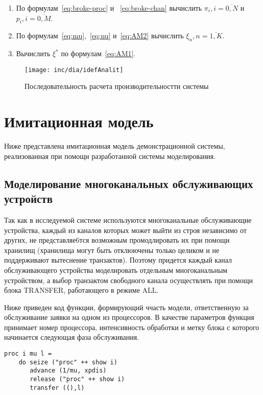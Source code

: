 \begin{enumerate}
\item По формулам~\ref{eq:broke-proc} и ~\ref{eq:broke-chan} вычислить $\pi_i, i=\overline{0,N}$ и $p_i, i=\overline{0,M} $.
\item По формулам~\ref{eq:mu},~\ref{eq:nu} и~\ref{eq:AM2} вычислить $\xi_n, n=\overline{1,K}$.
\item Вычислить $\xi^{*}$ по формулам~\ref{eq:AM1}.
\end{enumerate}


\begin{figure}[ht!]
\centering
\texttt{[image: inc/dia/idefAnalit]}
\caption{Последовательность расчета производительностти системы}
\label{fig:idefAnalit}
\end{figure}

\section{Имитационная модель}

Ниже представлена имитационная модель демонстрационной системы, реализованная при помощи разработанной системы моделирования.

\subsection{Моделирование многоканальных обслуживающих устройств}

Так как в исследуемой системе используются многоканальные обслуживающие устройства, каждый из каналов которых может выйти из строя независимо от других, не представляе6тся возможным промодлировать их при помощи хранилищ (хранилища могут быть отклюючены только целиком и не поддерживают вытеснение транзактов). Поэтому придется каждый канал обслуживающего устройства моделировать отдельным многоканальным устройством, а выбор транзактом свободного канала осуществлять при помощи блока TRANSFER, работающего в режиме ALL.

Ниже приведен код функции, формирующий ччасть модели, ответственную за обслуживание заявки на одном из процессоров. В качестве параметров функция принимает номер процессора, интенсивность обработки и метку блока с которого начинается следующая фаза обслуживания.

\begin{verbatim}
proc i mu l =
    do seize ("proc" ++ show i)
       advance (1/mu, xpdis)
       release ("proc" ++ show i)
       transfer ((),l)
\end{verbatim}

